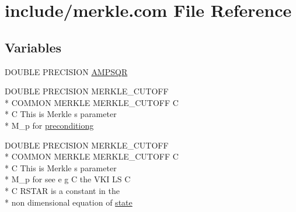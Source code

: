 \hypertarget{merkle_8com}{\section{include/merkle.com File Reference}
\label{merkle_8com}
}
\subsection*{Variables}
\begin{DoxyCompactItemize}
\item 
D\-O\-U\-B\-L\-E P\-R\-E\-C\-I\-S\-I\-O\-N \hyperlink{merkle_8com_a090e7861d41fe8b944374d3c9f7365bd}{A\-M\-P\-S\-Q\-R}
\item 
D\-O\-U\-B\-L\-E P\-R\-E\-C\-I\-S\-I\-O\-N M\-E\-R\-K\-L\-E\-\_\-\-C\-U\-T\-O\-F\-F \\*
C\-O\-M\-M\-O\-N M\-E\-R\-K\-L\-E M\-E\-R\-K\-L\-E\-\_\-\-C\-U\-T\-O\-F\-F C \\*
C This is Merkle s parameter \\*
M\-\_\-p for \hyperlink{merkle_8com_a0598863afc1fabc08a4d63618ed6d7d1}{preconditiong}
\item 
D\-O\-U\-B\-L\-E P\-R\-E\-C\-I\-S\-I\-O\-N M\-E\-R\-K\-L\-E\-\_\-\-C\-U\-T\-O\-F\-F \\*
C\-O\-M\-M\-O\-N M\-E\-R\-K\-L\-E M\-E\-R\-K\-L\-E\-\_\-\-C\-U\-T\-O\-F\-F C \\*
C This is Merkle s parameter \\*
M\-\_\-p for see e g C the V\-K\-I L\-S C \\*
C R\-S\-T\-A\-R is a constant in the \\*
non dimensional equation of \hyperlink{merkle_8com_a0ca46ab387e5b2d25720de7e533a6180}{state}
\end{DoxyCompactItemize}


